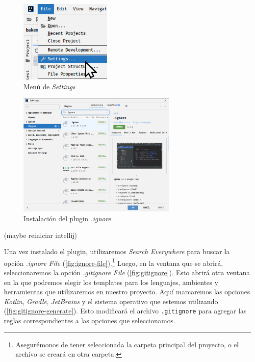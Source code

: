   \begin{figure}[ht!]
    \centering
    \includegraphics[width=0.4\textwidth]{img/oop/tdd/gradle/idea64_file_settings.png}
    \caption{Menú de \textit{Settings}}
    \label{fig:settings}
  \end{figure}

  \begin{figure}[ht!]
    \centering
    \includegraphics[width=0.7\textwidth]{img/oop/tdd/gradle/idea64_ignore_plugin.png}
    \caption{Instalación del plugin \textit{.ignore}}
    \label{fig:ignore}
  \end{figure}

  (maybe reiniciar intellij)

  Una vez instalado el plugin, utilizaremos \textit{Search Everywhere} para buscar la opción 
  \textit{.ignore File} (\cref{fig:ignore-file}).\footnote{
    Asegurémonos de tener seleccionada la carpeta principal del proyecto, o el archivo se creará
    en otra carpeta.
  }
  Luego, en la ventana que se abrirá, seleccionaremos la opción \textit{.gitignore File} 
  (\cref{fig:gitignore}).
  Esto abrirá otra ventana en la que podremos elegir los templates para los lenguajes, ambientes y
  herramientas que utilizaremos en nuestro proyecto.
  Aquí marcaremos las opciones \textit{Kotlin}, \textit{Gradle}, \textit{JetBrains} y el sistema
  operativo que estemos utilizando (\cref{fig:gitignore-generate}).
  Esto modificará el archivo \texttt{.gitignore} para agregar las reglas correspondientes a las 
  opciones que seleccionamos.


